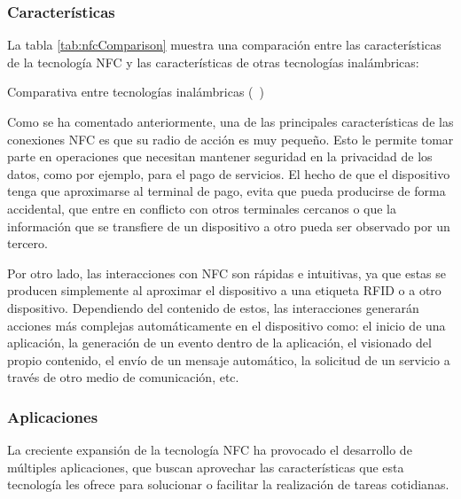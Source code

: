   \subsubsection{Características}

La tabla \ref{tab:nfcComparison} muestra una comparación entre 
las características de la tecnología \acs{NFC} y las características de 
otras tecnologías inalámbricas:

\begin{sidewaystable}[hp]
  \centering
  {\footnotesize
  
  }
  \caption[Comparativa entre tecnologías inalámbricas]
  {Comparativa entre tecnologías inalámbricas (~\cite{bib:nfcComparison})}
  \label{tab:nfcComparison}
\end{sidewaystable}

Como se ha comentado anteriormente, una de las principales características de 
las conexiones \acs{NFC} es que su radio de acción es muy pequeño. Esto le
permite tomar parte en operaciones que necesitan mantener seguridad en la
privacidad de los datos, como por ejemplo, para el pago de servicios. El
hecho de que el dispositivo tenga que aproximarse al terminal de pago, evita
que pueda producirse de forma accidental, que entre en conflicto con otros
terminales cercanos o que la información que se transfiere de un dispositivo
a otro pueda ser observado por un tercero.

Por otro lado, las interacciones con \acs{NFC} son rápidas e intuitivas, ya 
que estas se producen  simplemente al aproximar el dispositivo a una etiqueta 
\acs{RFID} o a otro dispositivo. Dependiendo del contenido de estos, las 
interacciones generarán acciones más complejas automáticamente en el 
dispositivo como: el inicio de una aplicación, la generación de un evento 
dentro de la aplicación, el visionado del propio contenido, el envío de un 
mensaje automático, la solicitud de un servicio a través de otro medio de 
comunicación, etc.

  \subsubsection{Aplicaciones}
La creciente expansión de la tecnología \acs{NFC} ha provocado el desarrollo
de múltiples aplicaciones, que buscan aprovechar las características que esta 
tecnología les ofrece para solucionar o facilitar la realización de tareas 
cotidianas.

